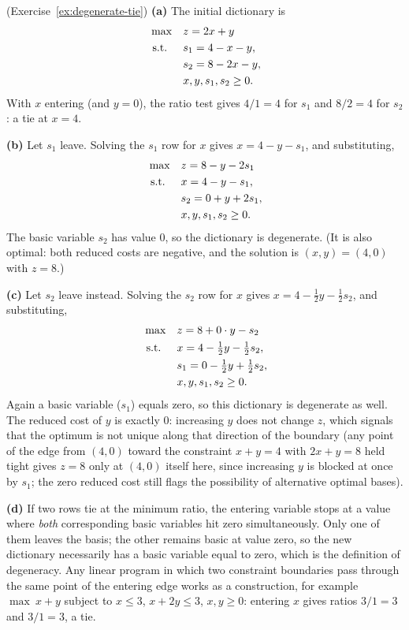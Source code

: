 \begin{solution}(Exercise~\ref{ex:degenerate-tie})
\textbf{(a)} The initial dictionary is
\[
\begin{aligned}
\max\quad & z = 2x + y \\
\mbox{ s.t. }\quad & s_1 = 4 - x - y, \\
& s_2 = 8 - 2x - y, \\
& x, y, s_1, s_2 \geq 0.
\end{aligned}
\]
With $x$ entering (and $y = 0$), the ratio test gives $4/1 = 4$ for $s_1$ and $8/2 = 4$ for $s_2$: a tie at $x = 4$.

\textbf{(b)} Let $s_1$ leave.  Solving the $s_1$ row for $x$ gives $x = 4 - y - s_1$, and substituting,
\[
\begin{aligned}
\max\quad & z = 8 - y - 2s_1 \\
\mbox{ s.t. }\quad & x = 4 - y - s_1, \\
& s_2 = 0 + y + 2s_1, \\
& x, y, s_1, s_2 \geq 0.
\end{aligned}
\]
The basic variable $s_2$ has value $0$, so the dictionary is degenerate.  (It is also optimal: both reduced costs are negative, and the solution is $(x, y) = (4, 0)$ with $z = 8$.)

\textbf{(c)} Let $s_2$ leave instead.  Solving the $s_2$ row for $x$ gives $x = 4 - \tfrac12 y - \tfrac12 s_2$, and substituting,
\[
\begin{aligned}
\max\quad & z = 8 + 0 \cdot y - s_2 \\
\mbox{ s.t. }\quad & x = 4 - \tfrac12 y - \tfrac12 s_2, \\
& s_1 = 0 - \tfrac12 y + \tfrac12 s_2, \\
& x, y, s_1, s_2 \geq 0.
\end{aligned}
\]
Again a basic variable ($s_1$) equals zero, so this dictionary is degenerate as well.  The reduced cost of $y$ is exactly $0$: increasing $y$ does not change $z$, which signals that the optimum is not unique along that direction of the boundary (any point of the edge from $(4,0)$ toward the constraint $x + y = 4$ with $2x + y = 8$ held tight gives $z = 8$ only at $(4,0)$ itself here, since increasing $y$ is blocked at once by $s_1$; the zero reduced cost still flags the possibility of alternative optimal bases).

\textbf{(d)} If two rows tie at the minimum ratio, the entering variable stops at a value where \emph{both} corresponding basic variables hit zero simultaneously.  Only one of them leaves the basis; the other remains basic at value zero, so the new dictionary necessarily has a basic variable equal to zero, which is the definition of degeneracy.  Any linear program in which two constraint boundaries pass through the same point of the entering edge works as a construction, for example $\max\ x + y$ subject to $x \leq 3$, $x + 2y \leq 3$, $x, y \geq 0$: entering $x$ gives ratios $3/1 = 3$ and $3/1 = 3$, a tie.
\end{solution}

